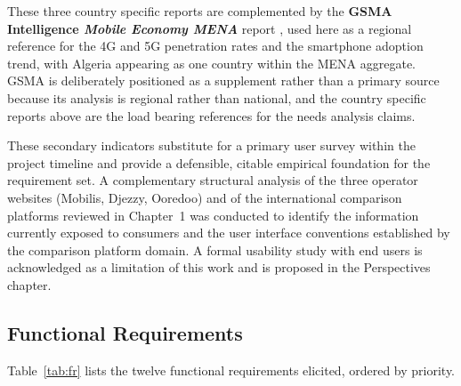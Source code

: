 These three country specific reports are complemented by the \textbf{GSMA Intelligence \textit{Mobile Economy MENA}} report \parencite{GSMA2024}, used here as a regional reference for the 4G and 5G penetration rates and the smartphone adoption trend, with Algeria appearing as one country within the MENA aggregate. GSMA is deliberately positioned as a supplement rather than a primary source because its analysis is regional rather than national, and the country specific reports above are the load bearing references for the needs analysis claims.

These secondary indicators substitute for a primary user survey within the project timeline and provide a defensible, citable empirical foundation for the requirement set. A complementary structural analysis of the three operator websites (Mobilis, Djezzy, Ooredoo) and of the international comparison platforms reviewed in Chapter~1 was conducted to identify the information currently exposed to consumers and the user interface conventions established by the comparison platform domain. A formal usability study with end users is acknowledged as a limitation of this work and is proposed in the Perspectives chapter.

\subsection{Functional Requirements}

Table~\ref{tab:fr} lists the twelve functional requirements elicited, ordered by priority.

